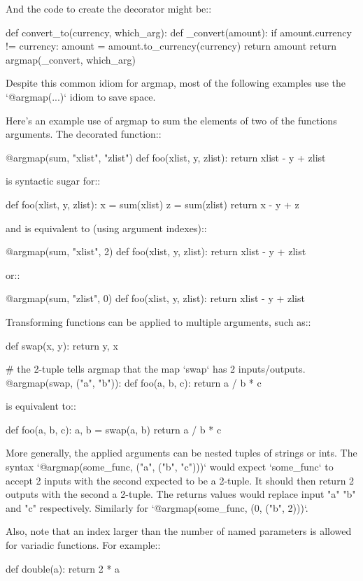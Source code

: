 \begin{DoxyVerb}
And the code to create the decorator might be::

    def convert_to(currency, which_arg):
        def _convert(amount):
            if amount.currency != currency:
                amount = amount.to_currency(currency)
            return amount
        return argmap(_convert, which_arg)

Despite this common idiom for argmap, most of the following examples
use the `@argmap(...)` idiom to save space.

Here's an example use of argmap to sum the elements of two of the functions
arguments. The decorated function::

    @argmap(sum, "xlist", "zlist")
    def foo(xlist, y, zlist):
        return xlist - y + zlist

is syntactic sugar for::

    def foo(xlist, y, zlist):
        x = sum(xlist)
        z = sum(zlist)
        return x - y + z

and is equivalent to (using argument indexes)::

    @argmap(sum, "xlist", 2)
    def foo(xlist, y, zlist):
        return xlist - y + zlist

or::

    @argmap(sum, "zlist", 0)
    def foo(xlist, y, zlist):
        return xlist - y + zlist

Transforming functions can be applied to multiple arguments, such as::

    def swap(x, y):
        return y, x

    # the 2-tuple tells argmap that the map `swap` has 2 inputs/outputs.
    @argmap(swap, ("a", "b")):
    def foo(a, b, c):
        return a / b * c

is equivalent to::

    def foo(a, b, c):
        a, b = swap(a, b)
        return a / b * c

More generally, the applied arguments can be nested tuples of strings or ints.
The syntax `@argmap(some_func, ("a", ("b", "c")))` would expect `some_func` to
accept 2 inputs with the second expected to be a 2-tuple. It should then return
2 outputs with the second a 2-tuple. The returns values would replace input "a"
"b" and "c" respectively. Similarly for `@argmap(some_func, (0, ("b", 2)))`.

Also, note that an index larger than the number of named parameters is allowed
for variadic functions. For example::

    def double(a):
        return 2 * a


\end{DoxyVerb}
